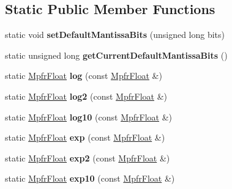 \subsection*{Static Public Member Functions}
\begin{DoxyCompactItemize}
\item 
\mbox{\label{class_mpfr_float_ad78d5a59ad0ba0806b9b6d3447a589c2}} 
static void {\bfseries set\+Default\+Mantissa\+Bits} (unsigned long bits)
\item 
\mbox{\label{class_mpfr_float_ac6a8002e7d726526076fa421d50104c7}} 
static unsigned long {\bfseries get\+Current\+Default\+Mantissa\+Bits} ()
\item 
\mbox{\label{class_mpfr_float_a4f95828fd6e9c53493bd04b018b318b7}} 
static \hyperlink{class_mpfr_float}{Mpfr\+Float} {\bfseries log} (const \hyperlink{class_mpfr_float}{Mpfr\+Float} \&)
\item 
\mbox{\label{class_mpfr_float_a34baf65e4b91e29f6532b317ec21c93a}} 
static \hyperlink{class_mpfr_float}{Mpfr\+Float} {\bfseries log2} (const \hyperlink{class_mpfr_float}{Mpfr\+Float} \&)
\item 
\mbox{\label{class_mpfr_float_ac0e0e1e41da174c80e6cf57da7070bb3}} 
static \hyperlink{class_mpfr_float}{Mpfr\+Float} {\bfseries log10} (const \hyperlink{class_mpfr_float}{Mpfr\+Float} \&)
\item 
\mbox{\label{class_mpfr_float_a4811160415c1f52e7d7f44607ff3febd}} 
static \hyperlink{class_mpfr_float}{Mpfr\+Float} {\bfseries exp} (const \hyperlink{class_mpfr_float}{Mpfr\+Float} \&)
\item 
\mbox{\label{class_mpfr_float_a04021ea2a119165ae85288563a2d96a6}} 
static \hyperlink{class_mpfr_float}{Mpfr\+Float} {\bfseries exp2} (const \hyperlink{class_mpfr_float}{Mpfr\+Float} \&)
\item 
\mbox{\label{class_mpfr_float_a9d151e2f188c426f63bf6a5e3302932c}} 
static \hyperlink{class_mpfr_float}{Mpfr\+Float} {\bfseries exp10} (const \hyperlink{class_mpfr_float}{Mpfr\+Float} \&)
\item 

\end{DoxyCompactItemize}
